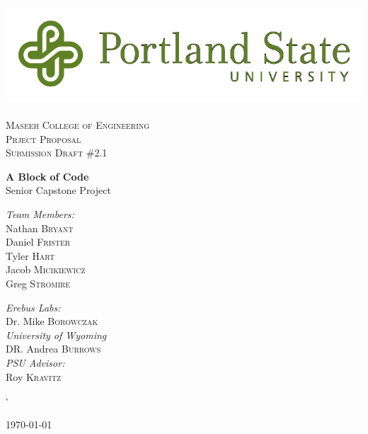 
\linespread{1.1}
 
\begin{titlepage} 
\begin{center} 
 
\includegraphics[width=.75\textwidth]{./PSU_logo.png}~\\[.5cm] 
 
\textsc{\LARGE \color{PSU} Maseeh College of Engineering}\\[1.5cm] 
 
\textsc{\Large Prject Proposal}\\[0.5cm]
\textsc{\Large Submission Draft \#2.1}\\[0.5cm]
\vspace{1cm} 
 
{ \huge \bfseries\color{PSU} A Block of Code\\[0.4cm] } 
  \large Senior Capstone Project
 
\vspace{2.5cm} 
 \begin{multicols}{2}
    
\begin{flushleft}
\noindent 
 \large 
\emph{\color{PSU}Team Members:}\\ 
Nathan \textsc{Bryant}\\ 
Daniel \textsc{Frister}\\
Tyler  \textsc{Hart}\\
Jacob   \textsc{Micikiewicz}\\
Greg    \textsc{Stromire}\\
\end{flushleft} 

 \begin{flushleft}
  \large 
 \emph{\color{PSU}Erebus Labs:} \\ 
 Dr. Mike  \textsc{Borowczak}\\ 
 \emph{\color{PSU}University of Wyoming}\\
 DR. Andrea \textsc{Burrows}\\ 
 \emph{\color{PSU}PSU Advisor:}\\ 
 Roy \textsc{Kravitz} 
 \end{flushleft}


 \end{multicols}` 
\vfill 
 
{\large \today} 
 
\end{center} 
\end{titlepage} 
 \tableofcontents

